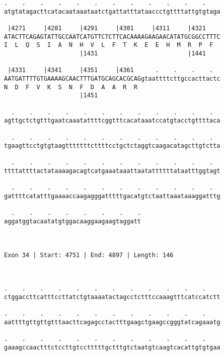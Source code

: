 \documentclass{article}
\begin{document}
\begin{Verbatim}
.    .    .    .    .    .    .    .    .    .    .    .    
atgtatagacttcatacaataaataatctgattatttataaccctgttttattgtgtaga
                                                            
 |4271     |4281     |4291     |4301     |4311     |4321    
ATACTTCAGAGTATTGCCAATCATGTTCTCTTCACAAAAGAAGAACATATGCGGCCTTTC
I  L  Q  S  I  A  N  H  V  L  F  T  K  E  E  H  M  R  P  F  
                     |1431                         |1441    
  
 |4331     |4341     |4351     |4361      .    .    .    .  
AATGATTTTGTGAAAAGCAACTTTGATGCAGCACGCAGgtaattttcttgccacttactc
N  D  F  V  K  S  N  F  D  A  A  R  R                       
                     |1451                                  
  
  .    .    .    .    .    .    .    .    .    .    .    .  
agttgctctgtttgaatcaaatattttcggtttcacataaatccatgtacctgttttaca
                                                            
  .    .    .    .    .    .    .    .    .    .    .    .  
tgaagttcctgtgtaagtttttttcttttcctgctctaggtcaagacatagcttgtctta
                                                            
  .    .    .    .    .    .    .    .    .    .    .    .  
ttttattttactataaaagacagtcatgaaataaattaatattttttataatttggtagt
                                                            
  .    .    .    .    .    .    .    .    .    .    .    .  
gattttcatatttgaaaaccaagagggatttttgacatgtctaattaaataaaggatttg
                                                            
  .    .    .    .    .    .    .    .
aggatggtacaatatgtggacaaggaagaagtaggatt
                                      
                                      
 
Exon 34 | Start: 4751 | End: 4897 | Length: 146



.    .    .    .    .    .    .    .    .    .    .    .    
ctggaccttcatttccttatctgtaaaatactagcctctttccaaagtttcatccatctt
                                                            
.    .    .    .    .    .    .    .    .    .    .    .    
aattttgttgttgtttaacttcagagcctactttgaagctgaagccgggtatcagaaatg
                                                            
.    .    .    .    .    .    .    .    .    .    .    .    
gaaagccaactttctccttgtcctttttgctttgtctaatgtcaagtcacattgtgtgaa
                                                            

\end{Verbatim}
\end{document}
